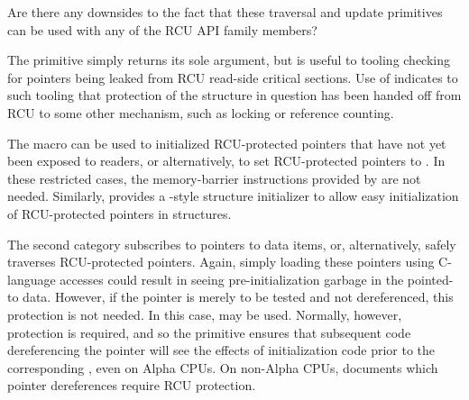 \QuickQuiz{}
	Are there any downsides to the fact that these traversal and update
	primitives can be used with any of the RCU API family members?
 \QuickQuizEnd

The  primitive simply returns its sole argument,
but is useful to tooling checking for pointers being leaked from
RCU read-side critical sections.
Use of  indicates to such tooling that protection
of the structure in question has been handed off from RCU to some other
mechanism, such as locking or reference counting.

The  macro can be used to initialized RCU-protected
pointers that have not yet been exposed to readers, or alternatively,
to set RCU-protected pointers to .
In these restricted cases, the memory-barrier instructions provided by
 are not needed.
Similarly,  provides a \GCC-style
structure initializer to allow easy initialization of RCU-protected
pointers in structures.

The second category subscribes to pointers to data items, or,
alternatively, safely traverses RCU-protected pointers.
Again, simply loading these pointers using C-language accesses
could result in seeing pre-initialization garbage in the pointed-to data.
However, if the pointer is merely to be tested and not dereferenced,
this protection is not needed.
In this case,  may be used.
Normally, however, protection is required, and so the
 primitive ensures that subsequent code
dereferencing the pointer will see the effects of initialization code
prior to the corresponding , even on Alpha CPUs.
On non-Alpha CPUs,  documents which pointer
dereferences require RCU protection.

